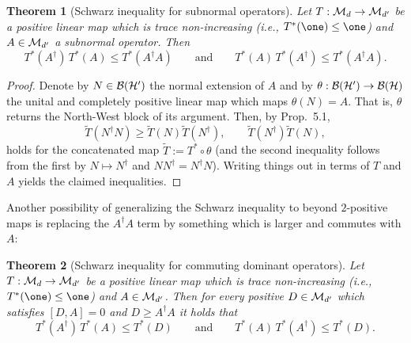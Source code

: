 \documentclass[11pt,a4paper]{article}
\theoremstyle{plain}
\newtheorem{theorem}{Theorem}[section]
\theoremstyle{definition}
\theoremstyle{remark}
\numberwithin{equation}{section}
\begin{document}
\begin{theorem}[Schwarz inequality for subnormal operators]
    Let $T:\mathcal{M}_d \to \mathcal{M}_{d'}$ be a positive linear map which is trace non-increasing
    (i.e., $T^*(\one)\le \one$) and $A\in \mathcal{M}_{d'}$ a subnormal operator. Then
    \begin{equation}\label{eq:5.7}
        T^*(A^\dagger)\,T^*(A) \le T^*(A^\dagger A)
        \qquad\text{and}\qquad
        T^*(A)\,T^*(A^\dagger) \le T^*(A^\dagger A).
    \end{equation}
\end{theorem}

\begin{proof}
    Denote by $N\in \mathcal{B}(\mathcal{H}')$ the normal extension of $A$ and by
    $\theta:\mathcal{B}(\mathcal{H}')\to \mathcal{B}(\mathcal{H})$ the unital and completely positive
    linear map which maps $\theta(N)=A$. That is, $\theta$ returns the North-West block
    of its argument. Then, by Prop.~5.1,
    \[
        \widetilde T(N^\dagger N) \ge \widetilde T(N)\widetilde T(N^\dagger),
        \qquad
        \widetilde T(N^\dagger)\widetilde T(N),
    \]
    holds for the concatenated map $\widetilde T := T^*\circ \theta$ (and the second
    inequality follows from the first by $N\mapsto N^\dagger$ and $NN^\dagger=N^\dagger N$).
    Writing things out in terms of $T$ and $A$ yields the claimed inequalities.
\end{proof}

Another possibility of generalizing the Schwarz inequality to beyond $2$-positive maps
is replacing the $A^\dagger A$ term by something which is larger and commutes with
$A$:

\begin{theorem}[Schwarz inequality for commuting dominant operators]
    Let $T:\mathcal{M}_d \to \mathcal{M}_{d'}$ be a positive linear map which is trace non-increasing
    (i.e., $T^*(\one)\le \one$) and $A\in \mathcal{M}_{d'}$. Then for every positive
    $D\in \mathcal{M}_{d'}$ which satisfies $[D,A]=0$ and $D\ge A^\dagger A$ it holds that
    \begin{equation}\label{eq:5.8}
        T^*(A^\dagger)\,T^*(A) \le T^*(D)
        \qquad\text{and}\qquad
        T^*(A)\,T^*(A^\dagger) \le T^*(D).
    \end{equation}
\end{theorem}
\end{document}
